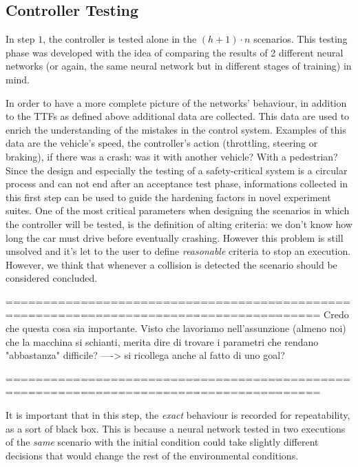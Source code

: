 \subsection{Controller Testing}


In step $1$, the controller is tested alone in the $(h+1)\cdot n$ scenarios. This testing phase was developed with the idea of comparing the results of 2 different neural networks (or again, the same neural network but in different stages of training) in mind.

In order to have a more complete picture of the networks' behaviour, in addition to the TTFs as defined above additional data are collected. This data are used to enrich the understanding of the mistakes in the control system. Examples of this data are the vehicle's speed, the controller's action (throttling, steering or braking), if there was a crash: was it with another vehicle? With a pedestrian? \newline
Since the design and especially the testing of a safety-critical system is a circular process and can not end after an acceptance test phase, informations collected in this first step can be used to guide the hardening factors in novel experiment suites.\newline
One of the most critical parameters when designing the scenarios in which the controller will be tested, is the definition of alting criteria: we don't know how long the car must drive before eventually crashing. However this problem is still unsolved and it's let to the user to define \textsl{reasonable} criteria to stop an execution. However, we think that whenever a collision is detected the scenario should be considered concluded.

========================================================================================
Credo che questa cosa sia importante. Visto che lavoriamo nell'assunzione (almeno noi) che la macchina si schianti, merita dire di trovare i parametri che rendano "abbastanza" difficile?   ----> si ricollega anche al fatto di uno goal?

========================================================================================
\newline

It is important that in this step, the \textsl{exact} behaviour is recorded for repeatability, as a sort of black box. This is because a neural network tested in two executions of the \textsl{same} scenario with the  initial condition could take slightly different decisions that would change the rest of the environmental conditions.\newline

